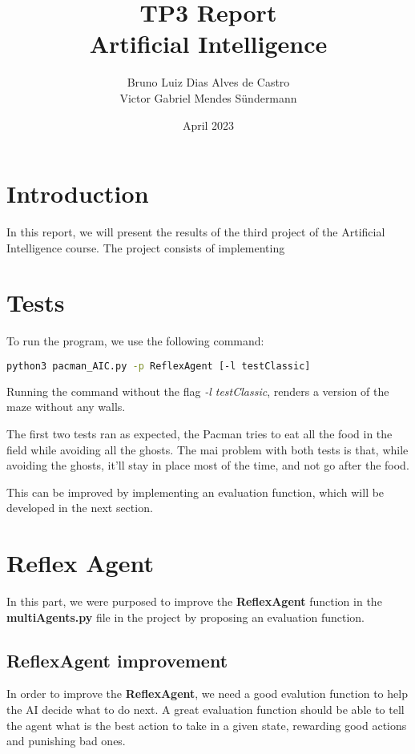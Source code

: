 \documentclass{article}
\title{\huge TP3 Report \\ Artificial Intelligence}
\author{Bruno Luiz Dias Alves de Castro \\ Victor Gabriel Mendes Sündermann}
\date{April 2023}
\begin{document}
\maketitle

\section{Introduction}

In this report, we will present the results of the third project of the Artificial Intelligence course. The project consists of implementing

\section{Tests}
To run the program, we use the following command:

\hbox{}

\begin{lstlisting}[language=bash]
    python3 pacman_AIC.py -p ReflexAgent [-l testClassic]
\end{lstlisting}

\hbox{}

Running the command without the flag \textit{-l testClassic}, renders a version of the maze without any walls.

The first two tests ran as expected, the Pacman tries to eat all the food in the field while avoiding all the ghosts. The mai problem with both tests is that, while avoiding the ghosts, it'll stay in place most of the time, and not go after the food.

This can be improved by implementing an evaluation function, which will be developed in the next section.

\section{Reflex Agent}

In this part, we were purposed to improve the \textbf{ReflexAgent} function in the \textbf{multiAgents.py} file in the project by proposing an evaluation function.

\subsection{ReflexAgent improvement}

In order to improve the \textbf{ReflexAgent}, we need a good evalution function to help the AI decide what to do next. A great evaluation function should be able to tell the agent what is the best action to take in a given state, rewarding good actions and punishing bad ones.
\end{document}
